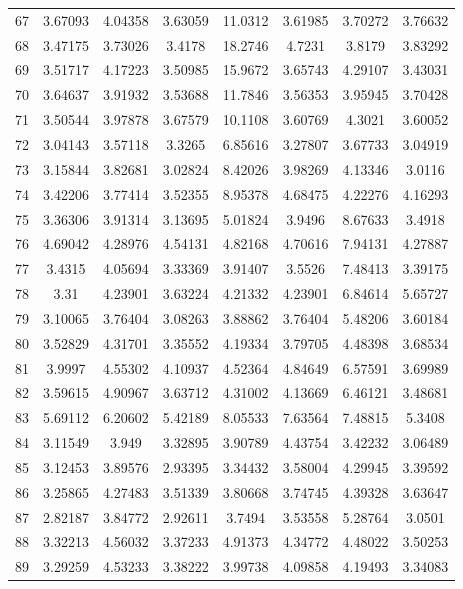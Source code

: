 \begin{figure}
\begin{tabular}{cccccccc}
67 & 3.67093 & 4.04358 & 3.63059 & 11.0312 & 3.61985 & 3.70272 & 3.76632\\
68 & 3.47175 & 3.73026 & 3.4178 & 18.2746 & 4.7231 & 3.8179 & 3.83292\\
69 & 3.51717 & 4.17223 & 3.50985 & 15.9672 & 3.65743 & 4.29107 & 3.43031\\
70 & 3.64637 & 3.91932 & 3.53688 & 11.7846 & 3.56353 & 3.95945 & 3.70428\\
71 & 3.50544 & 3.97878 & 3.67579 & 10.1108 & 3.60769 & 4.3021 & 3.60052\\
72 & 3.04143 & 3.57118 & 3.3265 & 6.85616 & 3.27807 & 3.67733 & 3.04919\\
73 & 3.15844 & 3.82681 & 3.02824 & 8.42026 & 3.98269 & 4.13346 & 3.0116\\
74 & 3.42206 & 3.77414 & 3.52355 & 8.95378 & 4.68475 & 4.22276 & 4.16293\\
75 & 3.36306 & 3.91314 & 3.13695 & 5.01824 & 3.9496 & 8.67633 & 3.4918\\
76 & 4.69042 & 4.28976 & 4.54131 & 4.82168 & 4.70616 & 7.94131 & 4.27887\\
77 & 3.4315 & 4.05694 & 3.33369 & 3.91407 & 3.5526 & 7.48413 & 3.39175\\
78 & 3.31 & 4.23901 & 3.63224 & 4.21332 & 4.23901 & 6.84614 & 5.65727\\
79 & 3.10065 & 3.76404 & 3.08263 & 3.88862 & 3.76404 & 5.48206 & 3.60184\\
80 & 3.52829 & 4.31701 & 3.35552 & 4.19334 & 3.79705 & 4.48398 & 3.68534\\
81 & 3.9997 & 4.55302 & 4.10937 & 4.52364 & 4.84649 & 6.57591 & 3.69989\\
82 & 3.59615 & 4.90967 & 3.63712 & 4.31002 & 4.13669 & 6.46121 & 3.48681\\
83 & 5.69112 & 6.20602 & 5.42189 & 8.05533 & 7.63564 & 7.48815 & 5.3408\\
84 & 3.11549 & 3.949 & 3.32895 & 3.90789 & 4.43754 & 3.42232 & 3.06489\\
85 & 3.12453 & 3.89576 & 2.93395 & 3.34432 & 3.58004 & 4.29945 & 3.39592\\
86 & 3.25865 & 4.27483 & 3.51339 & 3.80668 & 3.74745 & 4.39328 & 3.63647\\
87 & 2.82187 & 3.84772 & 2.92611 & 3.7494 & 3.53558 & 5.28764 & 3.0501\\
88 & 3.32213 & 4.56032 & 3.37233 & 4.91373 & 4.34772 & 4.48022 & 3.50253\\
89 & 3.29259 & 4.53233 & 3.38222 & 3.99738 & 4.09858 & 4.19493 & 3.34083\\

\end{tabular}
\end{figure}
